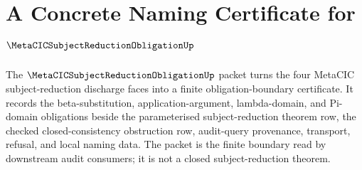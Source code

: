 \chapter{A Concrete Naming Certificate for $\MetaCICSubjectReductionObligationUp$}
\label{ch:concrete-instances-metacic-subject-reduction-obligation-namecert}

The $\MetaCICSubjectReductionObligationUp$ packet turns the four MetaCIC subject-reduction discharge faces into a finite obligation-boundary certificate. It records the beta-substitution, application-argument, lambda-domain, and Pi-domain obligations beside the parameterised subject-reduction theorem row, the checked closed-consistency obstruction row, audit-query provenance, transport, refusal, and local naming data. The packet is the finite boundary read by downstream audit consumers; it is not a closed subject-reduction theorem.

